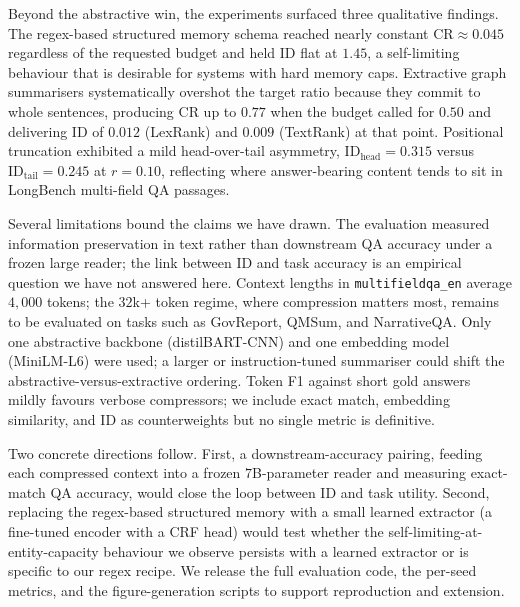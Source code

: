 \documentclass[11pt]{article}
\begin{document}
Beyond the abstractive win, the experiments surfaced three
qualitative findings. The regex-based structured memory schema
reached nearly constant $\mathrm{CR} \approx 0.045$ regardless of the
requested budget and held $\mathrm{ID}$ flat at $1.45$, a
self-limiting behaviour that is desirable for systems with hard
memory caps. Extractive graph summarisers systematically overshot the
target ratio because they commit to whole sentences, producing
$\mathrm{CR}$ up to $0.77$ when the budget called for $0.50$ and
delivering $\mathrm{ID}$ of $0.012$ (LexRank) and $0.009$ (TextRank) at that point. Positional
truncation exhibited a mild head-over-tail asymmetry,
$\mathrm{ID}_{\mathrm{head}} = 0.315$ versus
$\mathrm{ID}_{\mathrm{tail}} = 0.245$ at $r = 0.10$, reflecting where
answer-bearing content tends to sit in LongBench multi-field QA
passages.

Several limitations bound the claims we have drawn. The evaluation
measured information preservation in text rather than downstream QA
accuracy under a frozen large reader; the link between ID and task
accuracy is an empirical question we have not answered here. Context
lengths in \texttt{multifieldqa\_en} average $4{,}000$ tokens; the
$32$k+ token regime, where compression matters most, remains to be
evaluated on tasks such as GovReport, QMSum, and NarrativeQA. Only one
abstractive backbone (distilBART-CNN) and one embedding model
(MiniLM-L6) were used; a larger or instruction-tuned summariser could
shift the abstractive-versus-extractive ordering. Token F1 against
short gold answers mildly favours verbose compressors; we include
exact match, embedding similarity, and $\mathrm{ID}$ as counterweights
but no single metric is definitive.

Two concrete directions follow. First, a downstream-accuracy pairing,
feeding each compressed context into a frozen $7$B-parameter reader and
measuring exact-match QA accuracy, would close the loop between ID and
task utility. Second, replacing the regex-based structured memory with
a small learned extractor (a fine-tuned encoder with a CRF head) would
test whether the self-limiting-at-entity-capacity behaviour we observe
persists with a learned extractor or is specific to our regex recipe.
We release the full evaluation code, the per-seed metrics, and the
figure-generation scripts to support reproduction and extension.

\FloatBarrier


\end{document}

